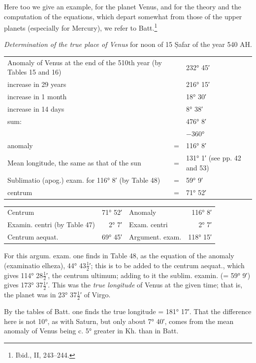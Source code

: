 \documentclass[11pt]{article}
\newcommand{\Pg}[1]{\marginpar{\footnotesize\color{gray}#1}}
\begin{document}
\par Here too we give an example, for the planet Venus, and for the theory and the computation of the equations, which depart somewhat from those of the upper planets (especially for Mercury), we refer to Batt.\footnote{Ibid., II, 243–244.}\par
\par \emph{Determination of the true place of Venus} for noon of 15 Ṣafar of the year 540 AH.\par
\begin{center}\small\begin{tabular}{lcl}
Anomaly of Venus at the end of the 510th year (by Tables 15 and 16) &  & 232° 45′ \\
increase in 29 years &  & 216° 15′ \\
increase in 1 month &  & 18° 30′ \\
increase in 14 days &  & 8° 38′ \\
sum: &  & 476° 8′ \\
 &  & −360° \\
anomaly & = & 116° 8′ \\
Mean longitude, the same as that of the sun & = & 131° 1′ (see pp. 42 and 53) \\
Sublimatio (apog.) exam. for 116° 8′ (by Table 48) & = & 59° 9′ \\
centrum & = & 71° 52′ \\
\end{tabular}\end{center}
\begin{center}\small\begin{tabular}{lrlr}
Centrum & 71° 52′ & Anomaly & 116° 8′ \\
Examin. centri (by Table 47) & 2° 7′ & Exam. centri & 2° 7′ \\
Centrum aequat. & 69° 45′ & Argument. exam. & 118° 15′ \\
\end{tabular}\end{center}
\par \Pg{55}For this argum. exam. one finds in Table 48, as the equation of the anomaly (examinatio elheza), 44° 43$\tfrac{1}{2}$′; this is to be added to the centrum aequat., which gives 114° 28$\tfrac{1}{2}$′, the centrum ultimum; adding to it the sublim. examin. (= 59° 9′) gives 173° 37$\tfrac{1}{2}$′. This was the \emph{true longitude} of Venus at the given time; that is, the planet was in 23° 37$\tfrac{1}{2}$′ of Virgo.\par
\par By the tables of Batt. one finds the true longitude = 181° 17′. That the difference here is not 10°, as with Saturn, but only about 7° 40′, comes from the mean anomaly of Venus being c. 5° greater in Kh. than in Batt.\par
\end{document}
